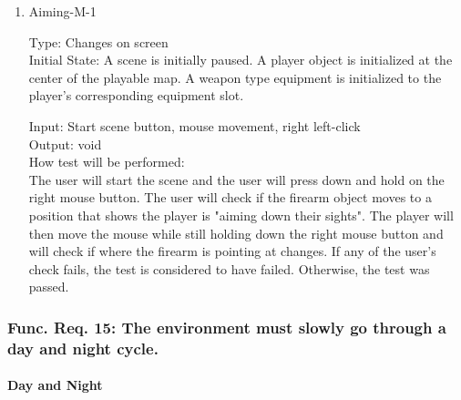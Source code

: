 \documentclass[12pt, titlepage]{article}
\begin{document}
\begin{enumerate}

\item{Aiming-M-1\\}

Type: Changes on screen \\
					
Initial State: A scene is initially paused. A player object is initialized at the center of the playable map. A weapon type equipment is initialized to the player's corresponding equipment slot.
					
Input: Start scene button, mouse movement, right left-click\\
					
Output: void\\
					
How test will be performed:\\ The user will start the scene and the user will press down and hold on the right mouse button. The user will check if the firearm object moves to a position that shows the player is "aiming down their sights". The player will then move the mouse while still holding down the right mouse button and will check if where the firearm is pointing at changes. If any of the user's check fails, the test is considered to have failed. Otherwise, the test was passed. \\

\end{enumerate}

\subsubsection{Func. Req. 15: The environment must slowly go through a day and night cycle.}

\paragraph{Day and Night}
\end{document}
